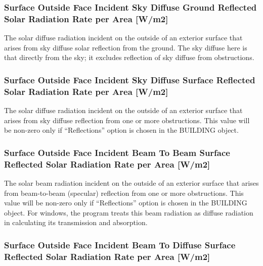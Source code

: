 \subsubsection{Surface Outside Face Incident Sky Diffuse Ground Reflected Solar Radiation Rate per Area {[}W/m2{]}}\label{surface-outside-face-incident-sky-diffuse-ground-reflected-solar-radiation-rate-per-area-wm2}

The solar diffuse radiation incident on the outside of an exterior surface that arises from sky diffuse solar reflection from the ground. The sky diffuse here is that directly from the sky; it excludes reflection of sky diffuse from obstructions.

\subsubsection{Surface Outside Face Incident Sky Diffuse Surface Reflected Solar Radiation Rate per Area {[}W/m2{]}}\label{surface-outside-face-incident-sky-diffuse-surface-reflected-solar-radiation-rate-per-area-wm2}

The solar diffuse radiation incident on the outside of an exterior surface that arises from sky diffuse reflection from one or more obstructions. This value will be non-zero only if ``Reflections'' option is chosen in the BUILDING object.

\subsubsection{Surface Outside Face Incident Beam To Beam Surface Reflected Solar Radiation Rate per Area {[}W/m2{]}}\label{surface-outside-face-incident-beam-to-beam-surface-reflected-solar-radiation-rate-per-area-wm2}

The solar beam radiation incident on the outside of an exterior surface that arises from beam-to-beam (specular) reflection from one or more obstructions. This value will be non-zero only if ``Reflections'' option is chosen in the BUILDING object. For windows, the program treats this beam radiation as diffuse radiation in calculating its transmission and absorption.

\subsubsection{Surface Outside Face Incident Beam To Diffuse Surface Reflected Solar Radiation Rate per Area {[}W/m2{]}}\label{surface-outside-face-incident-beam-to-diffuse-surface-reflected-solar-radiation-rate-per-area-wm2}

